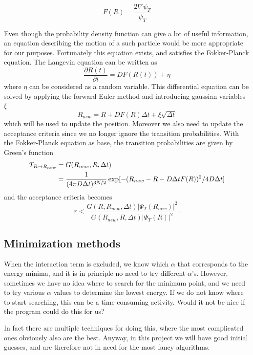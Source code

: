 \documentclass[norsk,a4paper,12pt]{article}
\begin{document}
\begin{equation}
	\label{eq:drift_force}
	F(R) = \frac{2 \nabla \psi_T}{\psi_T}
\end{equation}

Even though the probability density function can give a lot of useful information, an equation describing the motion of a such particle would be more appropriate for our purposes. Fortunately this equation exists, and satisfies the Fokker-Planck equation. The Langevin equation can be written as
\begin{equation}
\frac{\partial R(t)}{\partial t}=DF(R(t)) + \eta
\end{equation}
where $\eta$ can be considered as a random variable. This differential equation can be solved by applying the forward Euler method and introducing gaussian variables $\xi$
\begin{equation}
R_{new} = R + DF(R)\Delta t + \xi\sqrt{\Delta t}
\end{equation}
which will be used to update the position. Moreover we also need to update the acceptance criteria since we no longer ignore the transition probabilities. With the Fokker-Planck equation as base, the transition probabilities are given by Green's function
\begin{align}
T_{R\rightarrow R_{new}}&=G(R_{new},R,\Delta t)\notag\\
&=\frac{1}{(4\pi D\Delta t)^{3N/2}}\exp[-(R_{new} - R - D\Delta tF(R))^2/4D\Delta t] 
\end{align}
and the acceptance criteria becomes
\begin{equation}
r<\frac{G(R,R_{new},\Delta t)|\Psi_T(R_{new})|^2}{G(R_{new},R,\Delta t)|\Psi_T(R)|^2}.
\end{equation}

\subsection{Minimization methods}
When the interaction term is excluded, we know which $\alpha$ that corresponds to the energy minima, and it is in principle no need to try different $\alpha$'s. However, sometimes we have no idea where to search for the minimum point, and we need to try various $\alpha$ values to determine the lowest energy. If we do not know where to start searching, this can be a time consuming activity. Would it not be nice if the program could do this for us?

In fact there are multiple techniques for doing this, where the most complicated ones obviously also are the best. Anyway, in this project we will have good initial guesses, and are therefore not in need for the most fancy algorithms. 
\end{document}
